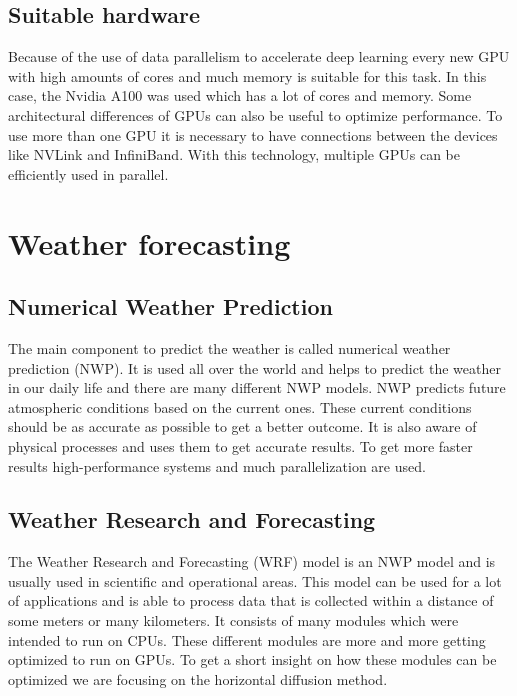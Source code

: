 \documentclass[conference]{IEEEtran}
\begin{document}
\vspace{\baselineskip}
\subsection{Suitable hardware}

Because of the use of data parallelism to accelerate deep learning every new GPU with high amounts of cores and much memory is suitable for this task. In this case, the Nvidia A100 was used which has a lot of cores and memory. Some architectural differences of GPUs can also be useful to optimize performance. To use more than one GPU it is necessary to have connections between the devices like NVLink and InfiniBand. With this technology, multiple GPUs can be efficiently used in parallel.\cite{b11}

\section{Weather forecasting}
\subsection{Numerical Weather Prediction}
The main component to predict the weather is called numerical weather prediction (NWP). It is used all over the world and helps to predict the weather in our daily life and there are many different NWP models. NWP predicts future atmospheric conditions based on the current ones. These current conditions should be as accurate as possible to get a better outcome. It is also aware of physical processes and uses them to get accurate results.\cite{b12} To get more faster results high-performance systems and much parallelization are used.\cite{b13}

\vspace{\baselineskip}
\subsection{Weather Research and Forecasting}
The Weather Research and Forecasting (WRF) model is an NWP model and is usually used in scientific and operational areas. This model can be used for a lot of applications and is able to process data that is collected within a distance of some meters or many kilometers. It consists of many modules which were intended to run on CPUs. These different modules are more and more getting optimized to run on GPUs. To get a short insight on how these modules can be optimized we are focusing on the horizontal diffusion method.\cite{b13}
\end{document}
